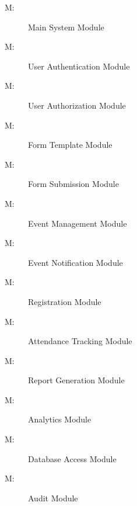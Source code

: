 \documentclass[12pt, titlepage]{article}
\newcounter{mnum}
\newcommand{\mthemnum}{M\themnum}
\begin{document}
\begin{description}
\item [\mthemnum\label{m1}:] Main System Module

\item [\mthemnum\label{m2}:] User Authentication Module

\item [\mthemnum\label{m3}:] User Authorization Module

\item [\mthemnum\label{m4}:] Form Template Module

\item [\mthemnum\label{m5}:] Form Submission Module

\item [\mthemnum\label{m6}:] Event Management Module

\item [\mthemnum\label{m7}:] Event Notification Module

\item [\mthemnum\label{m8}:] Registration Module

\item [\mthemnum\label{m9}:] Attendance Tracking Module

\item [\mthemnum\label{m10}:] Report Generation Module

\item [\mthemnum\label{m11}:] Analytics Module

\item [\mthemnum\label{m12}:] Database Access Module

\item [\mthemnum\label{m13}:] Audit Module

\end{description}
\end{document}
